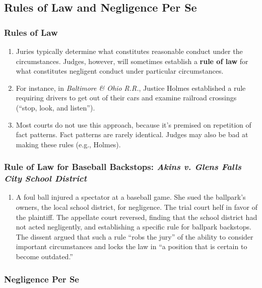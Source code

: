\subsection{Rules of Law and Negligence Per Se}

\subsubsection{Rules of Law}

\begin{enumerate}
    \item Juries typically determine what constitutes reasonable conduct under 
    the circumstances. Judges, however, will sometimes establish a 
    \textbf{rule of law} for 
    what constitutes negligent conduct under particular circumstances.
    \item For instance, in \emph{Baltimore \& Ohio R.R.}, Justice Holmes 
    established a rule requiring drivers to get out of their cars and examine 
    railroad crossings (``stop, look, and listen'').
    \item Most courts do not use this approach, because it's premised on 
    repetition of fact patterns. Fact patterns are rarely identical. Judges 
    may also be bad at making these rules (e.g., Holmes).
\end{enumerate}

\subsubsection{Rule of Law for Baseball Backstops: \emph{Akins v. Glens Falls City School District}}

\begin{enumerate}
    \item A foul ball injured a spectator at a baseball game. She sued the 
    ballpark's owners, the local school district, for negligence. The trial 
    court helf in favor of the plaintiff. The appellate court reversed, 
    finding that the school district had not acted negligently, and 
    establishing a specific rule for ballpark backstops. The dissent argued 
    that such a rule ``robs the jury'' of the ability to consider important 
    circumstances and locks the law in ``a position that is certain to become 
    outdated.''
\end{enumerate}

\subsubsection{Negligence Per Se}

